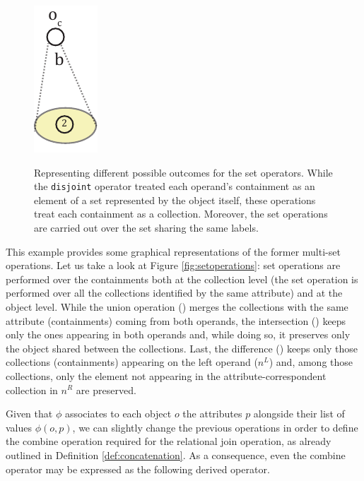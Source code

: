 \begin{figure}[!t]
\begin{minipage}[t]{0.3\textwidth}
	\label{fig:setintersection}
\end{minipage}\begin{minipage}[t]{0.1\textwidth}
	\centering
	\includegraphics[scale=0.8]{fig/05language/05setop_difference.pdf}
	\label{fig:setdifference}
\end{minipage}
	\caption{Representing different possible outcomes for the set operators. While the \texttt{disjoint} operator treated each operand's containment as an element of a set represented by the object itself, these operations treat each containment as a collection. Moreover, the set operations are carried out over the set sharing the same labels.}
	\label{fig:setoperations}
\end{figure}


\begin{example}
This example provides some graphical representations of the former multi-set operations. Let us take a look at Figure \vref{fig:setoperations}: set operations are performed over the containments both at the collection level (the set operation is performed over all the collections identified by the same attribute) and at the object level. While the union operation () merges the collections with the same attribute (containments) coming from both operands, the intersection () keeps only the ones appearing in both operands and, while doing so, it preserves only the object shared between the collections. Last, the difference () keeps only those collections (containments) appearing on the left operand ($n^L$) and, among those collections, only the element not appearing in the attribute-correspondent collection in $n^R$ are preserved.
\end{example}

Given that $\phi$ associates to each object $o$ the attributes $p$ alongside their list of values $\phi(o,p)$, we can slightly change the previous operations in order to define the combine operation required for the relational join operation, as already outlined in Definition \vref{def:concatenation}. As a consequence, even the combine operator may be expressed as the following derived operator.

